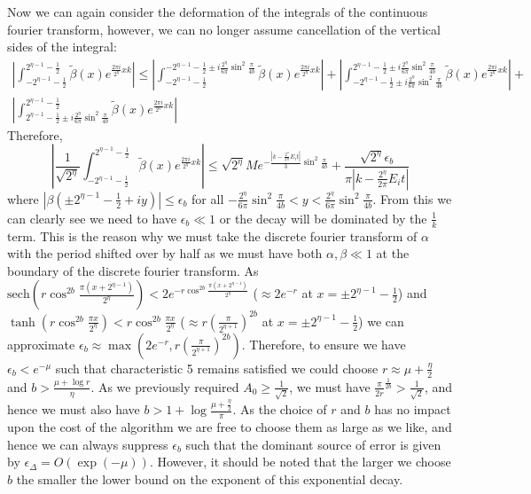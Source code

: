 \documentclass[aps,floatfix,10pt,amssymb,amsfont,amsmath,superscriptaddress,float,nofootinbib,longbibliography,nobalancelastpage,twocolumn]{revtex4-2}
\begin{document}
Now we can again consider the deformation of the integrals of the continuous fourier transform, however, we can no longer assume cancellation of the vertical sides of the integral:
\begin{multline}
     \left|\int_{-2^{\eta-1}-\frac{1}{2}}^{2^{\eta-1}-\frac{1}{2}}\tilde\beta(x)e^{\frac{2\pi i}{2^{\eta}}xk}\right| \leq \left|\int_{-2^{\eta-1}-\frac{1}{2}}^{-2^{\eta-1}-\frac{1}{2}\pm i\frac{2^{\eta}}{6\pi}\sin^2\frac{\pi}{4b}}\tilde\beta(x)e^{\frac{2\pi i}{2^{\eta}}xk}\right|+\left|\int_{-2^{\eta-1}-\frac{1}{2}\pm i\frac{2^{\eta}}{6\pi}\sin^2\frac{\pi}{4b}}^{2^{\eta-1}-\frac{1}{2}\pm i\frac{2^{\eta}}{6\pi}\sin^2\frac{\pi}{4b}}\tilde\beta(x)e^{\frac{2\pi i}{2^{\eta}}xk}\right|+\\\left|\int_{2^{\eta-1}-\frac{1}{2}\pm i \frac{2^{\eta}}{6\pi}\sin^2\frac{\pi}{4b}}^{2^{\eta-1}-\frac{1}{2}}\tilde\beta(x)e^{\frac{2\pi i}{2^{\eta}}xk}\right|
\end{multline}
Therefore,
\begin{equation}
    \left|\frac{1}{\sqrt{2^{\eta}}}\int_{-2^{\eta-1}-\frac{1}{2}}^{2^{\eta-1}-\frac{1}{2}}\tilde\beta(x)e^{\frac{2\pi i}{2^{\eta}}xk}\right| \leq \sqrt{2^{\eta}}Me^{-\frac{|k-\frac{2^{\eta}}{2\pi}E_i t|}{3}\sin^2 \frac{\pi}{4b}} + \frac{\sqrt{2^{\eta}}\epsilon_b}{\pi|k-\frac{2^{\eta}}{2\pi}E_i t|}
\end{equation}
where $|\beta(\pm2^{\eta-1}-\frac{1}{2}+iy)| \leq\epsilon_b$ for all $-\frac{2^{\eta}}{6\pi}\sin^2\frac{\pi}{4b}<y<\frac{2^{\eta}}{6\pi}\sin^2\frac{\pi}{4b}$. From this we can clearly see we need to have $\epsilon_b \ll 1$ or the decay will be dominated by the $\frac{1}{k}$ term. This is the reason why we must take the discrete fourier transform of $\alpha$ with the period shifted over by half as we must have both $\alpha, \beta \ll 1$ at the boundary of the discrete fourier transform. As $\text{sech}( r\cos^{2b} \frac{\pi (x+2^{\eta-1})}{2^{\eta}})< 2e^{-r\cos^{2b} \frac{\pi (x+2^{\eta-1})}{2^{\eta}}}$ ($\approx 2e^{-r}$ at $x=\pm2^{\eta-1}-\frac{1}{2}$) and $\tanh (r\cos^{2b} \frac{\pi x}{2^{\eta}}) < r\cos^{2b} \frac{\pi x}{2^{\eta}}$ ($\approx r (\frac{\pi}{2^{\eta+1}})^{2b}$ at $x=\pm2^{\eta-1}-\frac{1}{2}$) we can approximate $\epsilon_b \approx \max(2e^{-r},r (\frac{\pi}{2^{\eta+1}})^{2b})$. Therefore, to ensure we have $\epsilon_b < e^{-\mu}$ such that characteristic 5 remains satisfied we could choose $r\approx \mu+\frac{\eta}{2}$ and $b > \frac{\mu+\log r}{\eta}$. As we previously required $A_0 \geq \frac{1}{\sqrt{2}}$, we must have $\frac{\pi}{2r}^{\frac{1}{2b}} > \frac{1}{\sqrt{2}}$, and hence we must also have $b > 1 + \log \frac{\mu + \frac{\eta}{2}}{\pi}$. As the choice of $r$ and $b$ has no impact upon the cost of the algorithm we are free to choose them as large as we like, and hence we can always suppress $\epsilon_b$ such that the dominant source of error is given by $\epsilon_{\Delta} = O(\exp(-\mu))$. However, it should be noted that the larger we choose $b$ the smaller the lower bound on the exponent of this exponential decay.
\end{document}
